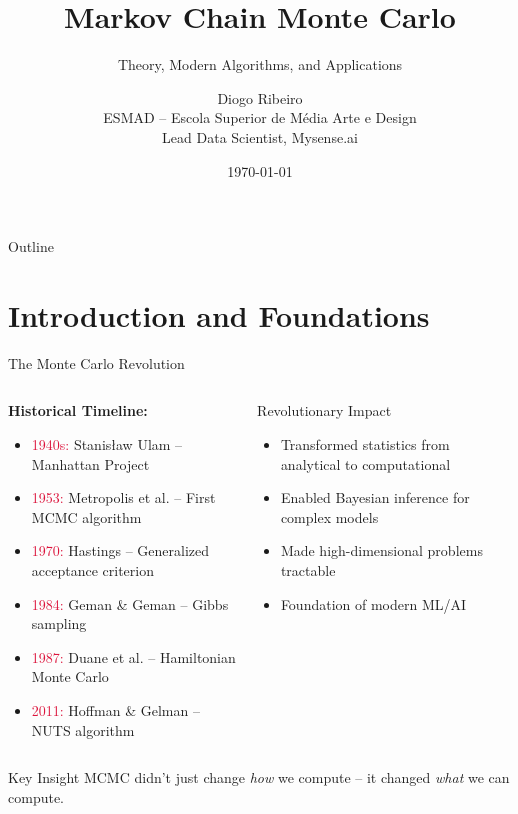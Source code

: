 \documentclass[aspectratio=169,11pt]{beamer}
\title[Advanced MCMC]{Markov Chain Monte Carlo}
\subtitle{Theory, Modern Algorithms, and Applications}
\author[D. Ribeiro]{Diogo Ribeiro\\
\small ESMAD -- Escola Superior de Média Arte e Design\\
\small Lead Data Scientist, Mysense.ai}
\date{\today}
\begin{document}
\begin{frame}
\titlepage
\end{frame}

\begin{frame}{Outline}
\tableofcontents
\end{frame}

\section{Introduction and Foundations}

\begin{frame}{The Monte Carlo Revolution}
\begin{columns}
\begin{column}{0.6\textwidth}
\textbf{Historical Timeline:}
\begin{itemize}
\item \textcolor{crimson}{1940s:} Stanisław Ulam -- Manhattan Project
\item \textcolor{crimson}{1953:} Metropolis et al. -- First MCMC algorithm
\item \textcolor{crimson}{1970:} Hastings -- Generalized acceptance criterion
\item \textcolor{crimson}{1984:} Geman \& Geman -- Gibbs sampling
\item \textcolor{crimson}{1987:} Duane et al. -- Hamiltonian Monte Carlo
\item \textcolor{crimson}{2011:} Hoffman \& Gelman -- NUTS algorithm
\end{itemize}
\end{column}
\begin{column}{0.4\textwidth}
\begin{block}{Revolutionary Impact}
\begin{itemize}
\item Transformed statistics from analytical to computational
\item Enabled Bayesian inference for complex models
\item Made high-dimensional problems tractable
\item Foundation of modern ML/AI
\end{itemize}
\end{block}
\end{column}
\end{columns}
\vspace{0.5cm}
\begin{alertblock}{Key Insight}
MCMC didn't just change \emph{how} we compute -- it changed \emph{what} we can compute.
\end{alertblock}
\end{frame}
\end{document}
